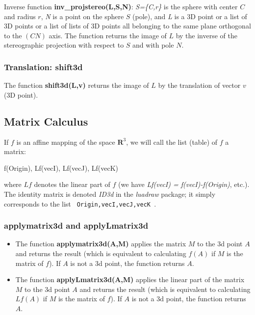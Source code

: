 Inverse function \textbf{inv\_projstereo(L,S,N)}: \emph{S=\{C,r\}} is the sphere with center $C$ and radius $r$, \emph{N} is a point on the sphere $S$ (pole), and \emph{L} is a 3D point or a list of 3D points or a list of lists of 3D points all belonging to the same plane orthogonal to the $(CN)$ axis. The function returns the image of $L$ by the inverse of the stereographic projection with respect to $S$ and with pole $N$.

\subsubsection{Translation: shift3d}

The function \textbf{shift3d(L,v)} returns the image of $L$ by the translation of vector $v$ (3D point).


\subsection{Matrix Calculus}

If $f$ is an affine mapping of the space $\mathbf R^3$, we will call the list (table) of $f$ a matrix:
\begin{Luacode}
{ f(Origin), Lf(vecI), Lf(vecJ), Lf(vecK) }
\end{Luacode}
where $Lf$ denotes the linear part of $f$ (we have \emph{Lf(vecI) = f(vecI)-f(Origin)}, etc.). The identity matrix is ​​denoted \emph{ID3d} in the \emph{luadraw} package; it simply corresponds to the list \texttt{ {Origin,vecI,vecJ,vecK} }.

\subsubsection{applymatrix3d ​​and applyLmatrix3d}

\begin{itemize}
\item The function \textbf{applymatrix3d(A,M)} applies the matrix $M$ to the 3d point $A$ and returns the result (which is equivalent to calculating $f(A)$ if $M$ is the matrix of $f$). If $A$ is not a 3d point, the function returns $A$.

\item The function \textbf{applyLmatrix3d(A,M)} applies the linear part of the matrix $M$ to the 3d point $A$ and returns the result (which is equivalent to calculating $Lf(A)$ if $M$ is the matrix of $f$). If $A$ is not a 3d point, the function returns $A$.

\end{itemize}

